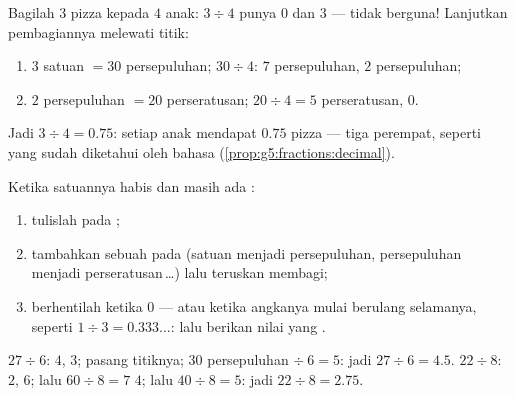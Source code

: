 \begin{example}\label{ex:g5:division:decimal}
Bagilah $3$ pizza kepada $4$ anak: $3 \div 4$ punya  $0$
dan  $3$ --- tidak berguna! Lanjutkan pembagiannya melewati titik:
\begin{enumerate}
  \item $3$ satuan $= 30$ persepuluhan; $30 \div 4$: $7$
        persepuluhan,  $2$ persepuluhan;
  \item $2$ persepuluhan $= 20$ perseratusan; $20 \div 4 = 5$
        perseratusan,  $0$.
\end{enumerate}
Jadi $3 \div 4 = 0.75$: setiap anak mendapat $0.75$ pizza --- tiga
perempat, seperti yang sudah diketahui oleh bahasa 
(\cref{prop:g5:fractions:decimal}).
\end{example}

\begin{method}\label{met:g5:division:continue}
Ketika satuannya habis dan masih ada :
\begin{enumerate}
  \item tulislah  pada ;
  \item tambahkan sebuah  pada  (satuan menjadi
        persepuluhan, persepuluhan menjadi perseratusan\,\dots) lalu
        teruskan membagi;
  \item berhentilah ketika  $0$ --- atau ketika angkanya
        mulai berulang selamanya, seperti $1 \div 3 = 0.333\dots$:
        lalu berikan nilai yang .
\end{enumerate}
\end{method}

\begin{example}\label{ex:g5:division:continue}
$27 \div 6$:  $4$,  $3$; pasang titiknya; $30$
persepuluhan $\div\ 6 = 5$: jadi $27 \div 6 = 4.5$. \quad
$22 \div 8$: $2$,  $6$; lalu $60 \div 8 = 7$  $4$;
lalu $40 \div 8 = 5$: jadi $22 \div 8 = 2.75$.
\end{example}

